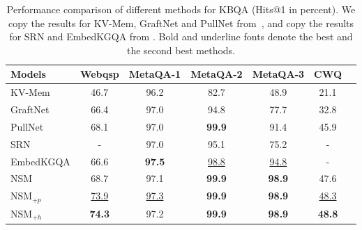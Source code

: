 \begin{table}[htbp]
	\centering
	\caption{Performance comparison of different methods for KBQA (Hits@1 in percent). We copy the results for KV-Mem, GraftNet and PullNet from~\cite{PullNet-EMNLP-2019}, and copy the results for SRN and EmbedKGQA from \cite{SRN-WSDM-2020,Saxena-ACL-2020}. Bold and underline fonts denote the best and the second best methods.}
	\label{tab:res}\begin{small}
		\begin{tabular}{m{} c c c c c c}
\hline
Models& Webqsp& MetaQA-1& MetaQA-2 & MetaQA-3 & CWQ\\
			\cline{2-6}
\hline
			KV-Mem&	46.7& 96.2& 82.7& 48.9& 21.1\\
			GraftNet &	66.4& 97.0& 94.8& 77.7& 32.8\\
			PullNet &	68.1& 97.0& \textbf{99.9}& 91.4& 45.9\\
			SRN &	-& 97.0& 95.1& 75.2& -\\
			EmbedKGQA&	66.6& \textbf{97.5}& \underline{98.8}& \underline{94.8}& -\\
			\hline
			NSM	&	68.7& 97.1& \textbf{99.9}& \textbf{98.9}&	47.6\\
			\hline
			NSM$_{+p}$&	\underline{73.9}& \underline{97.3}& \textbf{99.9}& \textbf{98.9}& \underline{48.3}	\\
			NSM$_{+h}$&	\textbf{74.3}& 97.2& \textbf{99.9}& \textbf{98.9}& \textbf{48.8}\\
			\hline
		\end{tabular}\end{small}
\end{table}


